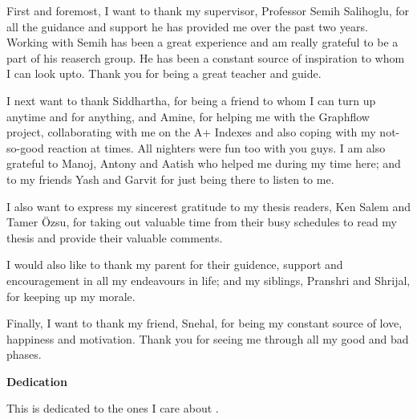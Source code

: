 First and foremost, I want to thank my supervisor, Professor Semih Salihoglu, for all the guidance and support he has provided me over the past two years. Working with Semih has been a great experience and am really grateful to be a part of his reaserch group. He has been a constant source of inspiration to whom I can look upto. Thank you for being a great teacher and guide.

I next want to thank Siddhartha, for being a friend to whom I can turn up anytime and for anything, and Amine, for helping me with the Graphflow project, collaborating with me on the A+ Indexes and also coping with my not-so-good reaction at times. All nighters were fun too with you guys. I am also grateful to Manoj, Antony and Aatish who helped me during my time here; and to my friends Yash and Garvit for just being there to listen to me.

I also want to express my sincerest gratitude to my thesis readers, Ken Salem and Tamer Özsu, for taking out valuable time from their busy schedules to read my thesis and provide their valuable comments. 

I would also like to thank my parent for their guidence, support and encouragement in all my endeavours in life; and my siblings, Pranshri and Shrijal, for keeping up my morale. 

Finally, I want to thank my friend, Snehal, for being my constant source of love, happiness and motivation. Thank you for seeing me through all my good and bad phases. 

\cleardoublepage


\begin{center}\textbf{Dedication}\end{center}

This is dedicated to the ones I care about .
\cleardoublepage

\renewcommand\contentsname{Table of Contents}
\tableofcontents
\cleardoublepage
{}    %

\listoftables
\cleardoublepage
{}		%

\listoffigures
\cleardoublepage
{}		%

\printglossaries
\cleardoublepage
{}		%


